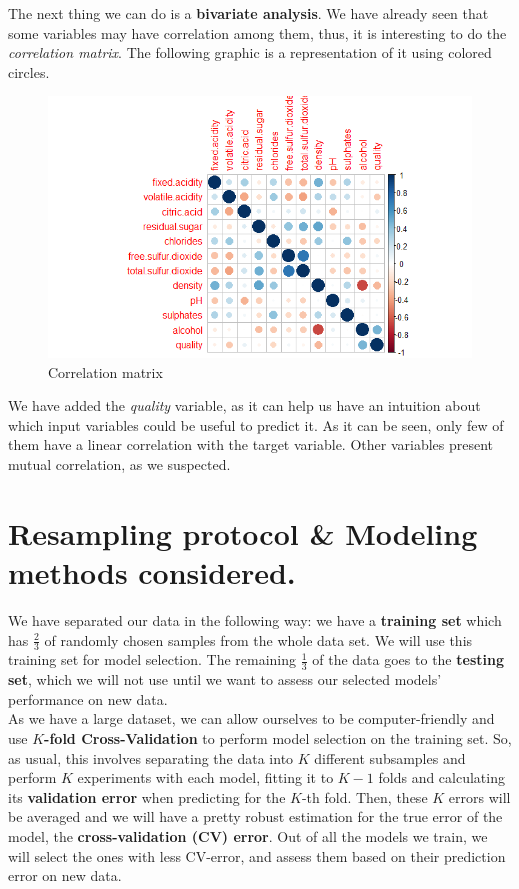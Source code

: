 \documentclass[10pt]{article}
\begin{document}
The next thing we can do is a \textbf{bivariate analysis}. We have already seen that some variables may have correlation among them, thus, it is interesting to do the \textit{correlation matrix}. The following graphic is a representation of it using colored circles. \\
\begin{figure}[H]
\centering
\caption{Correlation matrix}
\includegraphics[scale=0.5]{matrix_correlation_circles}
\end{figure}
We have added the \textit{quality} variable, as it can help us have an intuition about which input variables could be useful to predict it. As it can be seen, only few of them have a linear correlation with the target variable. Other variables present mutual correlation, as we suspected.

\section{Resampling protocol \& Modeling methods considered.}
We have separated our data in the following way: we have a \textbf{training set} which has $\frac{2}{3}$ of randomly chosen samples from the whole data set. We will use this training set for model selection. The remaining $\frac13$ of the data goes to the \textbf{testing set}, which we will not use until we want to assess our selected models' performance on new data.\\

As we have a large dataset, we can allow ourselves to be computer-friendly and use \textbf{$K$-fold Cross-Validation} to perform model selection on the training set. So, as usual, this involves separating the data into $K$ different subsamples and perform $K$ experiments with each model, fitting it to $K-1$ folds and calculating its \textbf{validation error} when predicting for the $K$-th fold. Then, these $K$ errors will be averaged and we will have a pretty robust estimation for the true error of the model, the \textbf{cross-validation (CV) error}. Out of all the models we train, we will select the ones with less CV-error, and assess them based on their prediction error on new data.\\
\end{document}
